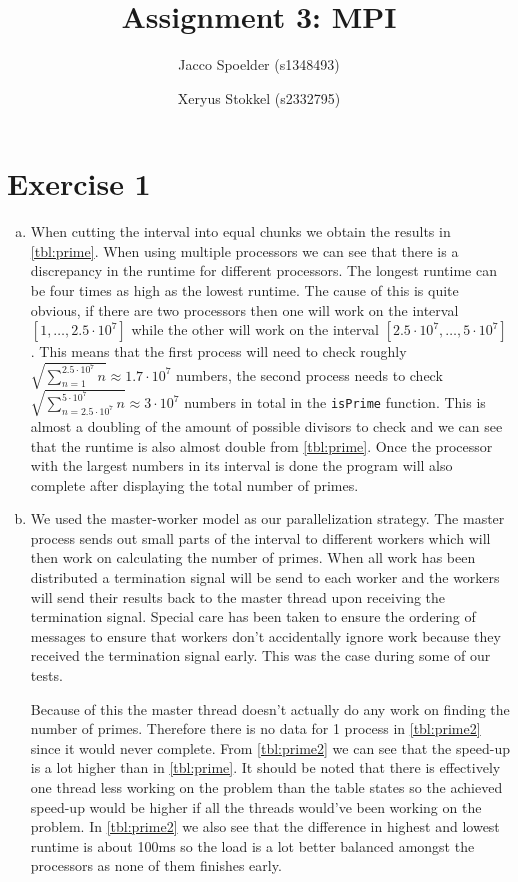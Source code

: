 \documentclass[a4paper]{article}
\title{Assignment 3: MPI}
\author{Jacco Spoelder (s1348493) \and Xeryus Stokkel (s2332795)}
\begin{document}
\maketitle

\section{Exercise 1}
\begin{enumerate}[(a)]
	\item When cutting the interval into equal chunks we obtain the results in \autoref{tbl:prime}. When using multiple processors we can see that there is a discrepancy in the runtime for different processors. The longest runtime can be four times as high as the lowest runtime. The cause of this is quite obvious, if there are two processors then one will work on the interval $[1, \ldots, 2.5 \cdot 10^7]$ while the other will work on the interval $[2.5 \cdot 10^7, \ldots, 5 \cdot 10^7]$. This means that the first process will need to check roughly $\sqrt{\sum_{n=1}^{2.5 \cdot 10^7}n} \approx 1.7 \cdot 10^7$ numbers, the second process needs to check $\sqrt{\sum_{n=2.5\cdot 10^7}^{5\cdot 10^7}n} \approx 3 \cdot 10^7$ numbers in total in the \texttt{isPrime} function. This is almost a doubling of the amount of possible divisors to check and we can see that the runtime is also almost double from \autoref{tbl:prime}. Once the processor with the largest numbers in its interval is done the program will also complete after displaying the total number of primes.
	\item We used the master-worker model as our parallelization strategy. The master process sends out small parts of the interval to different workers which will then work on calculating the number of primes. When all work has been distributed a termination signal will be send to each worker and the workers will send their results back to the master thread upon receiving the termination signal. Special care has been taken to ensure the ordering of messages to ensure that workers don't accidentally ignore work because they received the termination signal early. This was the case during some of our tests.
	
	Because of this the master thread doesn't actually do any work on finding the number of primes. Therefore there is no data for 1 process in \autoref{tbl:prime2} since it would never complete. From \autoref{tbl:prime2} we can see that the speed-up is a lot higher than in \autoref{tbl:prime}. It should be noted that there is effectively one thread less working on the problem than the table states so the achieved speed-up would be higher if all the threads would've been working on the problem. In \autoref{tbl:prime2} we also see that the difference in highest and lowest runtime is about 100ms so the load is a lot better balanced amongst the processors as none of them finishes early.
\end{enumerate}
\end{document}
